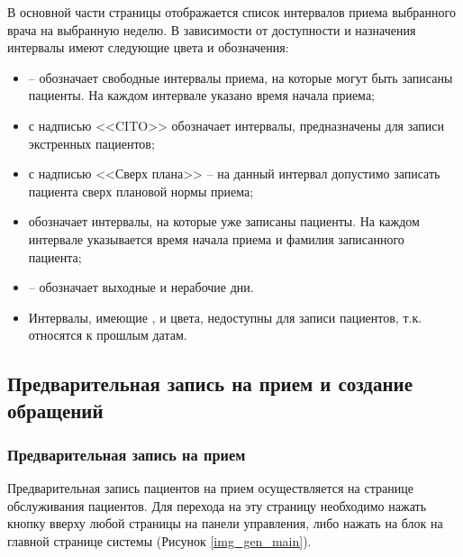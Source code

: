 В основной части страницы отображается список интервалов приема выбранного врача на выбранную неделю. В зависимости от доступности и назначения интервалы имеют следующие цвета и обозначения:
\begin{itemize}
 \item {} -- обозначает свободные интервалы приема, на которые могут быть записаны пациенты. На каждом интервале указано время начала приема;
 \item {} с надписью <<CITO>> обозначает интервалы, предназначены для записи экстренных пациентов;
 \item {} с надписью <<Сверх плана>> -- на данный интервал допустимо записать пациента сверх плановой нормы приема;
 \item {} обозначает интервалы, на которые уже записаны пациенты. На каждом интервале указывается время начала приема и фамилия записанного пациента;
 \item {} -- обозначает выходные и нерабочие дни.
 \item Интервалы, имеющие ,  и  цвета, недоступны для записи пациентов, т.к. относятся к прошлым датам.
\end{itemize}


\subsection{Предварительная запись на прием и создание обращений}

\subsubsection{Предварительная запись на прием} \label{pol_predvz}
Предварительная запись пациентов на прием осуществляется на странице обслуживания пациентов. Для перехода на эту страницу необходимо нажать кнопку  вверху любой страницы на панели управления, либо нажать на блок  на главной странице системы (Рисунок \ref{img_gen_main}).

